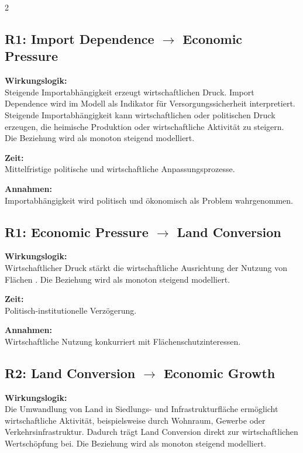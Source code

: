 \documentclass[10pt, a4paper]{article}
\begin{document}
\begin{multicols}{2}
\begin{minipage}{\linewidth}
\subsection*{R1: Import Dependence $\rightarrow$ Economic Pressure}

\textbf{Wirkungslogik:}\\
Steigende Importabhängigkeit erzeugt wirtschaftlichen Druck. Import Dependence wird im Modell als Indikator für Versorgungssicherheit interpretiert.
Steigende Importabhängigkeit kann wirtschaftlichen oder politischen Druck erzeugen, die heimische Produktion oder wirtschaftliche Aktivität zu steigern.\\
Die Beziehung wird als monoton steigend modelliert.

\textbf{Zeit:}\\
Mittelfristige politische und wirtschaftliche Anpassungsprozesse.

\textbf{Annahmen:}\\
Importabhängigkeit wird politisch und ökonomisch als Problem wahrgenommen.
\end{minipage}\vspace{1em}

\begin{minipage}{\linewidth}
\subsection*{R1: Economic Pressure $\rightarrow$ Land Conversion}

\textbf{Wirkungslogik:}\\
Wirtschaftlicher Druck stärkt die wirtschaftliche Ausrichtung der Nutzung von Flächen .
Die Beziehung wird als monoton steigend modelliert.

\textbf{Zeit:}\\
Politisch-institutionelle Verzögerung.

\textbf{Annahmen:}\\
Wirtschaftliche Nutzung konkurriert mit Flächenschutzinteressen.
\end{minipage}\vspace{1em}

\begin{minipage}{\linewidth}
\subsection*{R2: Land Conversion $\rightarrow$ Economic Growth}

\textbf{Wirkungslogik:}\\
Die Umwandlung von Land in Siedlungs- und Infrastrukturfläche ermöglicht wirtschaftliche Aktivität, beispielsweise durch Wohnraum, Gewerbe oder Verkehrsinfrastruktur.
Dadurch trägt Land Conversion direkt zur wirtschaftlichen Wertschöpfung bei.
Die Beziehung wird als monoton steigend modelliert.


\end{minipage}
\end{multicols}
\end{document}
